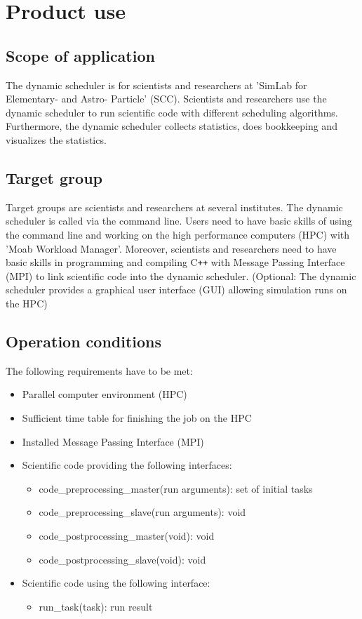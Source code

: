 \section{Product use}

\subsection{Scope of application}
The dynamic scheduler is for scientists and researchers at 'SimLab for Elementary- and Astro- Particle' (SCC). Scientists and researchers use the dynamic scheduler to run scientific code with different scheduling algorithms.
Furthermore, the dynamic scheduler collects statistics, does bookkeeping and visualizes the statistics.


\subsection{Target group}
Target groups are scientists and researchers at several institutes. The dynamic scheduler is called via the command line. Users need to have basic skills of using the command line and working on the high performance computers (HPC) with 'Moab Workload Manager'. Moreover, scientists and researchers need to have basic skills in programming and compiling C\texttt{++} with Message Passing Interface (MPI) to link scientific code into the dynamic scheduler.
(Optional: The dynamic scheduler provides a graphical user interface (GUI) allowing simulation runs on the HPC)


\subsection{Operation conditions}

The following requirements have to be met:
\begin{itemize}
	\item Parallel computer environment (HPC)
	\item Sufficient time table for finishing the job on the HPC
	\item Installed Message Passing Interface (MPI)
	\item Scientific code providing the following interfaces:
		\begin{itemize}
			\item code\_preprocessing\_master(run arguments): set of initial tasks
			\item code\_preprocessing\_slave(run arguments): void
			\item  code\_postprocessing\_master(void): void
			\item  code\_postprocessing\_slave(void): void
		\end{itemize}
	\item Scientific code using the following interface:
		\begin{itemize}
			\item run\_task(task): run result
		\end{itemize}
\end{itemize}